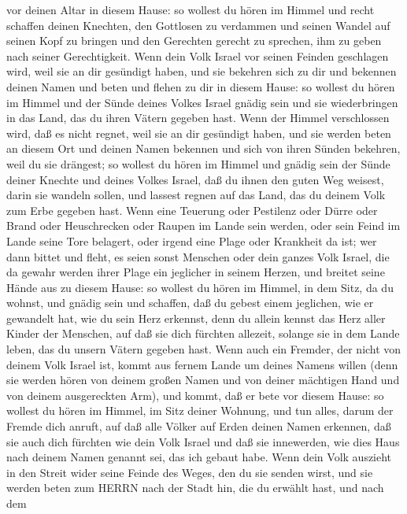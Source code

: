 vor deinen Altar in diesem Hause:  so wollest du hören im
Himmel und recht schaffen deinen Knechten, den Gottlosen zu verdammen
und seinen Wandel auf seinen Kopf zu bringen und den Gerechten gerecht
zu sprechen, ihm zu geben nach seiner Gerechtigkeit.  Wenn
dein Volk Israel vor seinen Feinden geschlagen wird, weil sie an dir
gesündigt haben, und sie bekehren sich zu dir und bekennen deinen Namen
und beten und flehen zu dir in diesem Hause:  so wollest du
hören im Himmel und der Sünde deines Volkes Israel gnädig sein und sie
wiederbringen in das Land, das du ihren Vätern gegeben hast.
 Wenn der Himmel verschlossen wird, daß es nicht regnet,
weil sie an dir gesündigt haben, und sie werden beten an diesem Ort und
deinen Namen bekennen und sich von ihren Sünden bekehren, weil du sie
drängest;  so wollest du hören im Himmel und gnädig sein
der Sünde deiner Knechte und deines Volkes Israel, daß du ihnen den
guten Weg weisest, darin sie wandeln sollen, und lassest regnen auf das
Land, das du deinem Volk zum Erbe gegeben hast.  Wenn eine
Teuerung oder Pestilenz oder Dürre oder Brand oder Heuschrecken oder
Raupen im Lande sein werden, oder sein Feind im Lande seine Tore
belagert, oder irgend eine Plage oder Krankheit da ist; 
wer dann bittet und fleht, es seien sonst Menschen oder dein ganzes Volk
Israel, die da gewahr werden ihrer Plage ein jeglicher in seinem Herzen,
und breitet seine Hände aus zu diesem Hause:  so wollest du
hören im Himmel, in dem Sitz, da du wohnst, und gnädig sein und
schaffen, daß du gebest einem jeglichen, wie er gewandelt hat, wie du
sein Herz erkennst, denn du allein kennst das Herz aller Kinder der
Menschen,  auf daß sie dich fürchten allezeit, solange sie
in dem Lande leben, das du unsern Vätern gegeben hast. 
Wenn auch ein Fremder, der nicht von deinem Volk Israel ist, kommt aus
fernem Lande um deines Namens willen  (denn sie werden
hören von deinem großen Namen und von deiner mächtigen Hand und von
deinem ausgereckten Arm), und kommt, daß er bete vor diesem Hause:
 so wollest du hören im Himmel, im Sitz deiner Wohnung, und
tun alles, darum der Fremde dich anruft, auf daß alle Völker auf Erden
deinen Namen erkennen, daß sie auch dich fürchten wie dein Volk Israel
und daß sie innewerden, wie dies Haus nach deinem Namen genannt sei, das
ich gebaut habe.  Wenn dein Volk auszieht in den Streit
wider seine Feinde des Weges, den du sie senden wirst, und sie werden
beten zum HERRN nach der Stadt hin, die du erwählt hast, und nach dem
